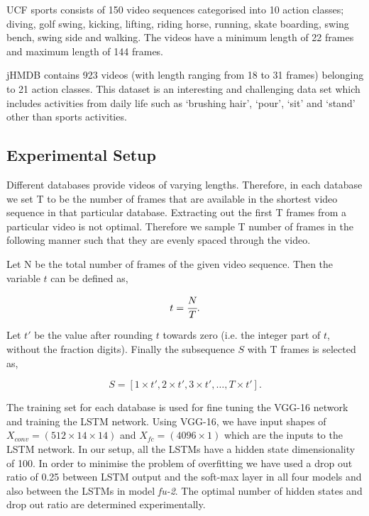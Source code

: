 \documentclass[10pt,twocolumn,letterpaper]{article}
\begin{document}
UCF sports consists of 150 video sequences categorised into 10 action classes; diving, golf swing, kicking, lifting, riding horse, running, skate boarding, swing bench, swing side and walking. The videos have a minimum length of 22 frames and maximum length of 144 frames. 

jHMDB contains 923 videos (with length ranging from 18 to 31 frames) belonging to 21 action classes. This dataset is an interesting and challenging data set which includes activities from daily life such as `brushing hair', `pour', `sit' and `stand' other than sports activities. 

\subsection{Experimental Setup}

Different databases provide videos of varying lengths. Therefore, in each database we set T to be the number of frames that are available in the shortest video sequence in that particular database. Extracting out the first T frames from a particular video is not optimal. Therefore we sample T number of frames in the following manner such that they are evenly spaced through the video.  

Let N be the total number of frames of the given video sequence. Then the variable $t$ can be defined as,

\begin{equation}\label{eq:1}
t=\cfrac{N}{T}.
\end{equation}
 
 Let $t'$ be the value after rounding $t$ towards zero (i.e. the integer part of $t$, without the fraction digits). Finally the subsequence $S$ with T frames is selected as,

\begin{equation}\label{eq:1}
S=[1\times{t'}, 2\times{t'},3\times{t'},\ldots,T\times{t'}].
\end{equation}
 

The training set for each database is used for fine tuning the VGG-16 network and training the LSTM network. Using VGG-16, we have input shapes of $X_{conv}=(512\times{14\times{14}})$ and $X_{fc}=(4096\times{1})$ which are the inputs to the LSTM network. In our setup, all the LSTMs have a hidden state dimensionality of 100. In order to minimise the problem of overfitting we have used a drop out ratio of 0.25 between LSTM output and the soft-max layer in all four models and also between the LSTMs in model \textit{fu-2}. The optimal number of hidden states and drop out ratio are determined experimentally. 
\end{document}

